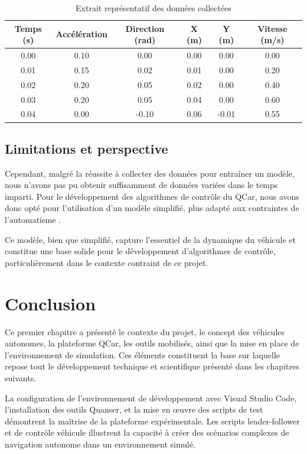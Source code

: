 \documentclass[12pt, a4paper]{report}
\begin{document}
\begin{table}[h!]
\centering
\caption{Extrait représentatif des données collectées}
\label{tab:donnee}
\begin{tabular}{|c|c|c|c|c|c|}
\hline
Temps (s) & Accélération & Direction (rad) & X (m) & Y (m) & Vitesse (m/s) \\
\hline
0.00 & 0.10 & 0.00  & 0.00 & 0.00  & 0.00 \\
0.01 & 0.15 & 0.02  & 0.01 & 0.00  & 0.20 \\
0.02 & 0.20 & 0.05  & 0.02 & 0.00  & 0.40 \\
0.03 & 0.20 & 0.05  & 0.04 & 0.00  & 0.60 \\
0.04 & 0.00 & -0.10 & 0.06 & -0.01 & 0.55 \\
\hline
\end{tabular}
\end{table}


\subsection{Limitations et perspective}

Cependant, malgré la réussite à collecter des données pour entraîner un modèle, nous n'avons pas pu obtenir suffisamment de données variées dans le temps imparti. Pour le développement des algorithmes de contrôle du QCar, nous avons donc opté pour l'utilisation d'un modèle simplifié, plus adapté aux contraintes de l'automatisme .

Ce modèle, bien que simplifié, capture l'essentiel de la dynamique du véhicule et constitue une base solide pour le développement d'algorithmes de contrôle, particulièrement dans le contexte contraint de ce projet.
\section{Conclusion }

Ce premier chapitre a présenté le contexte du projet, le concept des véhicules autonomes, la plateforme QCar, les outils mobilisés, ainsi que la mise en place de l'environnement de simulation. Ces éléments constituent la base sur laquelle repose tout le développement technique et scientifique présenté dans les chapitres suivants.

La configuration de l'environnement de développement avec Visual Studio Code, l'installation des outils Quanser, et la mise en œuvre des scripts de test démontrent la maîtrise de la plateforme expérimentale. Les scripts leader-follower et de contrôle véhicule illustrent la capacité à créer des scénarios complexes de navigation autonome dans un environnement simulé.
\end{document}
